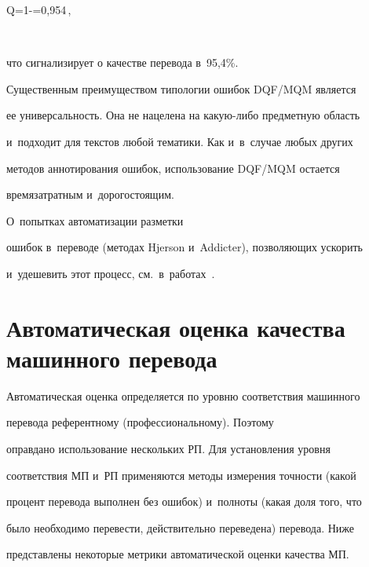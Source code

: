 Q=1-=0{,}954\,,

$$



\vspace*{-2pt}



\noindent

что сигнализирует о качестве перевода в~95,4\%. 

  

  Существенным преимуществом типологии ошибок DQF\!/\!MQM является 

ее универсальность. Она не нацелена на ка\-кую-ли\-бо предметную область 

и~подходит для текстов любой тематики. Как и~в~случае любых других 

методов аннотирования ошибок, использование DQF\!/\!MQM остается 

времязатратным и~дорогостоящим. 

  О~попытках автоматизации разметки 

ошибок в~переводе (методах Hjerson и~Addicter), позволяющих ускорить 

и~удешевить этот процесс, см.\ в~работах~\cite{17-r, 19-r}.



\vspace*{-6pt}

  

  \section{Автоматическая оценка качества машинного перевода}

  

  \vspace*{-6pt}

  

  Автоматическая оценка определяется по уровню соответствия машинного 

перевода референтному (профессиональному). Поэтому 

оправдано использование нескольких РП. Для установления уровня 

соответствия МП и~РП применяются методы измерения точности (какой 

процент перевода выполнен без ошибок) и~полноты (какая доля того, что 

было необходимо перевести, действительно переведена) перевода. Ниже 

представлены некоторые метрики автоматической оценки качества МП.

